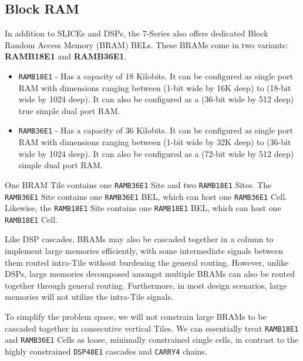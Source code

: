 \documentclass{article}
\begin{document}
        \begin{multicols}{2}


    \newpage

    \subsection{Block RAM}
        In addition to SLICEs and DSPs, the 7-Series also offers dedicated Block Random Access Memory (BRAM) BELs. 
        These BRAMs come in two variants: \textbf{RAMB18E1} and \textbf{RAMB36E1}. 
        \begin{itemize}
            \item \texttt{RAMB18E1} - 
            Has a capacity of 18 Kilobits. 
            It can be configured as single port RAM with dimensions ranging between (1-bit wide by 16K deep) to (18-bit wide by 1024 deep). 
            It can also be configured as a (36-bit wide by 512 deep) true simple dual port RAM. 
            \item \texttt{RAMB36E1} - 
            Has a capacity of 36 Kilobits. 
            It can be configured as single port RAM with dimensions ranging between (1-bit wide by 32K deep) to (36-bit wide by 1024 deep). 
            It can also be configured as a (72-bit wide by 512 deep) simple dual port RAM. 
        \end{itemize}

        One BRAM Tile contains one \texttt{RAMB36E1} Site and two \texttt{RAMB18E1} Sites. 
        The \texttt{RAMB36E1} Site contains one \texttt{RAMB36E1} BEL, which can host one \texttt{RAMB36E1} Cell. 
        Likewise, the \texttt{RAMB18E1} Site contains one \texttt{RAMB18E1} BEL, which can host one \texttt{RAMB18E1} Cell. 

        Like DSP cascades, BRAMs may also be cascaded together in a column to implement large memories efficiently, with some intermediate signals between them routed intra-Tile without burdening the general routing. 
        However, unlike DSPs, large memories decomposed amongst multiple BRAMs can also be routed together through general routing. 
        Furthermore, in most design scenarios, large memories will not utilize the intra-Tile signals. 
        
        To simplify the problem space, we will not constrain large BRAMs to be cascaded together in consecutive vertical Tiles. 
        We can essentially treat \texttt{RAMB18E1} and \texttt{RAMB36E1} Cells as loose, minimally constrained single cells, in contrast to the highly constrained \texttt{DSP48E1} cascades and \texttt{CARRY4} chains.


\end{multicols}
\end{document}
